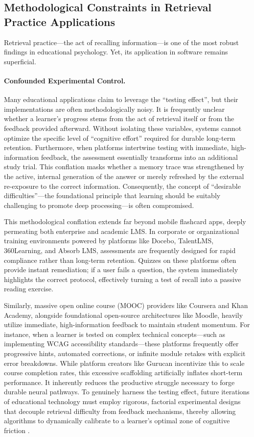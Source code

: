 \subsection{Methodological Constraints in Retrieval Practice Applications}

Retrieval practice—the act of recalling information—is one of the most robust findings in educational psychology. Yet, its application in software remains superficial.

\paragraph{Confounded Experimental Control.}
Many educational applications claim to leverage the ``testing effect'', but their implementations are often methodologically noisy. It is frequently unclear whether a learner’s progress stems from the act of retrieval itself or from the feedback provided afterward. Without isolating these variables, systems cannot optimize the specific level of ``cognitive effort'' required for durable long-term retention. Furthermore, when platforms intertwine testing with immediate, high-information feedback, the assessment essentially transforms into an additional study trial. This conflation masks whether a memory trace was strengthened by the active, internal generation of the answer or merely refreshed by the external re-exposure to the correct information. Consequently, the concept of ``desirable difficulties''---the foundational principle that learning should be suitably challenging to promote deep processing---is often compromised.

This methodological conflation extends far beyond mobile flashcard apps, deeply permeating both enterprise and academic LMS. In corporate or organizational training environments powered by platforms like Docebo, TalentLMS, 360Learning, and Absorb LMS, assessments are frequently designed for rapid compliance rather than long-term retention. Quizzes on these platforms often provide instant remediation; if a user fails a question, the system immediately highlights the correct protocol, effectively turning a test of recall into a passive reading exercise.

Similarly, massive open online course (MOOC) providers like Coursera and Khan Academy, alongside foundational open-source architectures like Moodle, heavily utilize immediate, high-information feedback to maintain student momentum. For instance, when a learner is tested on complex technical concepts—such as implementing WCAG accessibility standards—these platforms frequently offer progressive hints, automated corrections, or infinite module retakes with explicit error breakdowns. While platform creators like Gurucan incentivize this to scale course completion rates, this excessive scaffolding artificially inflates short-term performance. It inherently reduces the productive struggle necessary to forge durable neural pathways. To genuinely harness the testing effect, future iterations of educational technology must employ rigorous, factorial experimental designs that decouple retrieval difficulty from feedback mechanisms, thereby allowing algorithms to dynamically calibrate to a learner's optimal zone of cognitive friction \cite{sven2018}.

